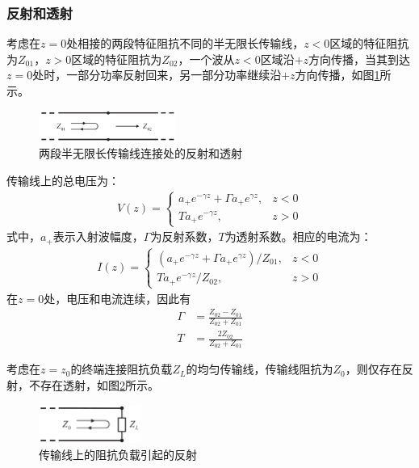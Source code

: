 \documentclass{article}
\numberwithin{equation}{section}
\begin{document}
\subsubsection{反射和透射}
考虑在$z=0$处相接的两段特征阻抗不同的半无限长传输线，$z<0$区域的特征阻抗为$Z_{01}$，$z>0$区域的特征阻抗为$Z_{02}$，一个波从$z<0$区域沿$+z$方向传播，当其到达$z=0$处时，一部分功率反射回来，另一部分功率继续沿$+z$方向传播，如图\ref{fig:fig37}所示。
\begin{figure}[ht]
    \centering
    \includegraphics[width=0.4\textwidth]{两段半无限长传输线连接处的反射和透射.PNG}
    \caption{两段半无限长传输线连接处的反射和透射}
    \label{fig:fig37}
\end{figure}
传输线上的总电压为：
\begin{align}
    \label{eq:eq294}
    V(z)=
    \left\{
        \begin{array}{lr}
            a_+e^{-\gamma z}+\Gamma a_+e^{\gamma z}, &z<0 \\
            Ta_+e^{-\gamma z},                       &z>0
        \end{array}
    \right.
\end{align}
式中，$a_+$表示入射波幅度，$\Gamma$为反射系数，$T$为透射系数。相应的电流为：
\begin{align}
    \label{eq:eq295}
    I(z)=
    \left\{
        \begin{array}{lr}
            (a_+e^{-\gamma z}+\Gamma a_+e^{\gamma z})/Z_{01}, &z<0 \\
            Ta_+e^{-\gamma z}/Z_{02},                         &z>0
        \end{array}
    \right.
\end{align}
在$z=0$处，电压和电流连续，因此有
\begin{align}
    \label{eq:eq296}
    \Gamma&=\frac{Z_{02}-Z_{01}}{Z_{02}+Z_{01}} \\
    \label{eq:eq297}
    T&=\frac{2Z_{02}}{Z_{02}+Z_{01}}
\end{align}
\par
考虑在$z=z_0$的终端连接阻抗负载$Z_L$的均匀传输线，传输线阻抗为$Z_0$，则仅存在反射，不存在透射，如图\ref{fig:fig38}所示。
\begin{figure}[ht]
    \centering
    \includegraphics[width=0.3\textwidth]{传输线上的阻抗负载引起的反射.PNG}
    \caption{传输线上的阻抗负载引起的反射}
    \label{fig:fig38}
\end{figure}
\end{document}
